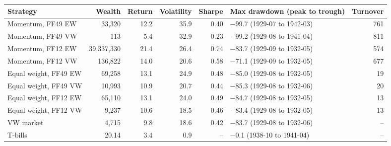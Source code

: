 \begin{tabular}{@{}lrrrrlr@{}}
\toprule
Strategy & Wealth & Return & Volatility & Sharpe & Max drawdown (peak to trough) & Turnover \\
\midrule
Momentum, FF49 EW & 33,320 & 12.2 & 35.9 & 0.40 & $-$99.7 (1929-07 to 1942-03) & 761 \\
Momentum, FF49 VW & 113 & 5.4 & 32.9 & 0.23 & $-$99.2 (1929-08 to 1941-04) & 811 \\
Momentum, FF12 EW & 39,337,330 & 21.4 & 26.4 & 0.74 & $-$83.7 (1929-09 to 1932-05) & 574 \\
Momentum, FF12 VW & 136,822 & 14.0 & 20.6 & 0.58 & $-$71.1 (1929-09 to 1932-05) & 677 \\
\midrule
Equal weight, FF49 EW & 69,258 & 13.1 & 24.9 & 0.48 & $-$85.0 (1929-08 to 1932-05) & 19 \\
Equal weight, FF49 VW & 10,993 & 10.9 & 20.7 & 0.44 & $-$85.3 (1929-08 to 1932-06) & 20 \\
Equal weight, FF12 EW & 65,110 & 13.1 & 24.0 & 0.49 & $-$84.7 (1929-08 to 1932-05) & 13 \\
Equal weight, FF12 VW & 9,237 & 10.6 & 18.5 & 0.46 & $-$83.4 (1929-08 to 1932-05) & 13 \\
\midrule
VW market & 4,715 & 9.8 & 18.6 & 0.42 & $-$83.7 (1929-08 to 1932-06) & -- \\
T-bills & 20.14 & 3.4 & 0.9 & -- & $-$0.1 (1938-10 to 1941-04) & -- \\
\bottomrule
\end{tabular}
